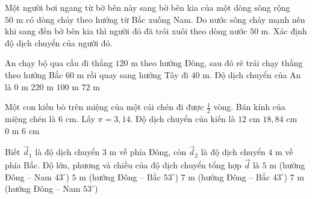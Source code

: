 \begin{vd} Một người bơi ngang từ bờ bên này sang bờ bên kia của một dòng sông rộng $50\text{ m}$ có dòng chảy theo hướng từ Bắc xuống Nam. Do nước sông chảy mạnh nên khi sang đến bờ bên kia thì người đó đã trôi xuôi theo dòng nước $50\text{ m}$. Xác định độ dịch chuyển của người đó.
\end{vd}

\begin{vd} An chạy bộ qua cầu đi thẳng $120\text{ m}$ theo hướng Đông, sau đó rẽ trái chạy thẳng theo hướng Bắc $60\text{ m}$ rồi quay sang hướng Tây đi $40\text{ m}$. Độ dịch chuyển của An là
\choice
{$0\text{ m}$}
{$220\text{ m}$}
{\True $100\text{ m}$}
{$72\text{ m}$}
\end{vd}

\begin{vd} Một con kiến bò trên miệng của một cái chén đi được $\frac{1}{2}$ vòng. Bán kính của miệng chén là $6\text{ cm}$. Lấy $\pi = 3{,}14$. Độ dịch chuyển của kiến là
\choice
{\True $12\text{ cm}$}
{$18{,}84\text{ cm}$}
{$0\text{ m}$}
{$6\text{ cm}$}
\end{vd}

\begin{vd} Biết $\vec{d}_1$ là độ dịch chuyển $3\text{ m}$ về phía Đông, còn $\vec{d}_2$ là độ dịch chuyển $4\text{ m}$ về phía Bắc. Độ lớn, phương và chiều của độ dịch chuyển tổng hợp $\vec{d}$ là
\choice
{$5\text{ m}$ (hướng Đông -- Nam $43^\circ$)}
{\True $5\text{ m}$ (hướng Đông -- Bắc $53^\circ$)}
{$7\text{ m}$ (hướng Đông -- Bắc $43^\circ$)}
{$7\text{ m}$ (hướng Đông -- Nam $53^\circ$)}
\end{vd}

